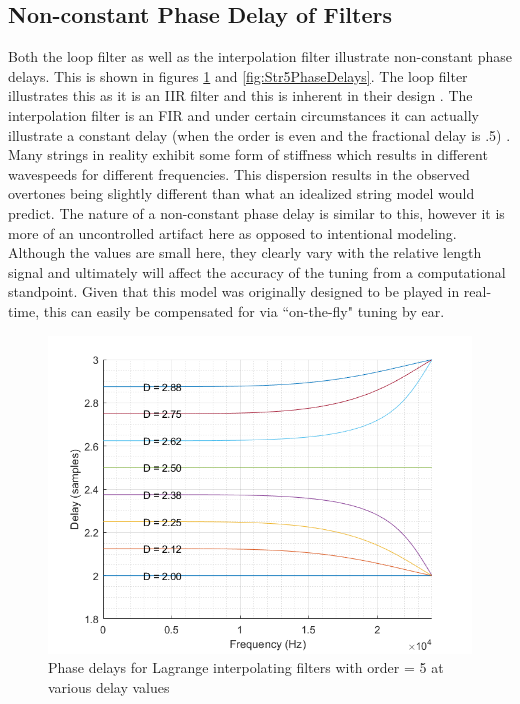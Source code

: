\documentclass[../main.tex]{subfiles}
\begin{document}
\clearpage

\subsection{Non-constant Phase Delay of Filters}
Both the loop filter as well as the interpolation filter illustrate non-constant phase delays. This is shown in figures \ref{fig:LagrangePhaseDelays} and \ref{fig:Str5PhaseDelays}. The loop filter illustrates this as it is an IIR filter and this is inherent in their design . The interpolation filter is an FIR and under certain circumstances it can actually illustrate a constant delay (when the order is even and the fractional delay is .5) . Many strings in reality exhibit some form of stiffness which results in different wavespeeds for different frequencies. This dispersion results in the observed overtones being slightly different than what an idealized string model would predict. The nature of a non-constant phase delay is similar to this, however it is more of an uncontrolled artifact here as opposed to intentional modeling. Although the values are small here, they clearly vary with the relative length signal and ultimately will affect the accuracy of the tuning from a computational standpoint. Given that this model was originally designed to be played in real-time, this can easily be compensated for via ``on-the-fly" tuning by ear.

\begin{figure}[h]
    \centering
    \includegraphics[scale=.65]{./images/plots/LagrangePhaseDelays.png}
    \caption{Phase delays for Lagrange interpolating filters with order = 5 at various delay values}
    \label{fig:LagrangePhaseDelays}
\end{figure}
\end{document}
